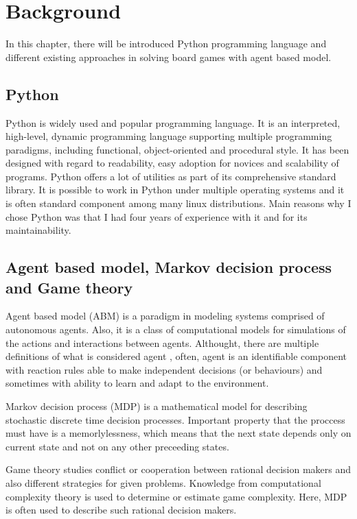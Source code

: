 \chapter{Background}\label{chap:2}
  In this chapter, there will be introduced Python programming language and
different existing approaches in solving board games with agent based model.

\section{Python}
Python is widely used and popular
programming language. It is an interpreted, high-level, dynamic programming
language supporting multiple programming paradigms, including functional,
object-oriented and procedural style. It has been designed with regard to
readability, easy adoption for novices and scalability of programs. Python
offers a lot of utilities as part of its comprehensive standard library. It is
possible to work in Python under multiple operating systems and it is often
standard component among many linux distributions. Main reasons why I chose
Python was that I had four years of experience with it and for its
maintainability.

\section{Agent based model, Markov decision process and Game theory}
Agent based model (ABM) is a paradigm in modeling systems comprised
of autonomous agents. Also, it is a class of computational models for
simulations of the actions and interactions between agents. Althought, there
are multiple definitions of what is considered agent \cite{abm}, often, agent
is an identifiable component with reaction rules able to make independent
decisions (or behaviours) and sometimes with ability to learn and adapt to
the environment.

Markov decision process (MDP) is a mathematical model for describing stochastic
discrete time decision processes. Important property that the proccess must
have is a memorlylessness, which means that the next state depends only
on current state and not on any other preceeding states.

Game theory studies conflict or cooperation between rational decision makers
and also different strategies for given problems. Knowledge from computational
complexity theory is used to determine or estimate game complexity. Here, MDP
is often used to describe such rational decision makers.

